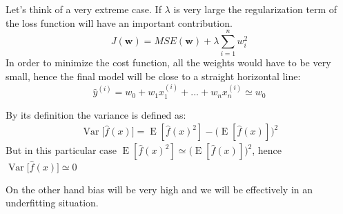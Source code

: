 \documentclass[a4paper]{article}
\begin{document}
Let's think of a very extreme case. If $\lambda$ is very large the regularization term of the loss function will have an important contribution. 
$$ J(\mathbf{w}) = MSE(\mathbf{w}) + \lambda \sum_{i=1}^{n} w_{i}^2
$$
In order to minimize the cost function, all the weights would have to be very small, hence the final model will be close to a straight horizontal line:
$$
    \hat{y}^{(i)} = w_0 + w_1 x_1^{(i)} + ... + w_n x_n^{(i)} \simeq w_0
$$

By its definition the variance is defined as:
$$
{\displaystyle {\begin{aligned}\operatorname {Var} {\big [}{\hat {f}}(x){\big ]}=\operatorname {E} [{\hat {f}}(x)^{2}]-{\Big (}\operatorname {E} [{\hat {f}}(x)]{\Big )}^{2}\end{aligned}}}
$$
But in this particular case $\operatorname {E} [{\hat {f}}(x)^{2}] \simeq {\Big (}\operatorname {E} [{\hat {f}}(x)]{\Big )}^{2}$, hence $\operatorname {Var} {\big [}{\hat {f}}(x){\big ]} \simeq  0$

On the other hand bias will be very high and we will be effectively in an underfitting situation.
\end{document}
